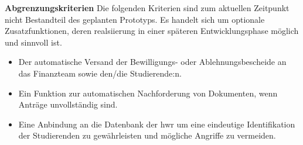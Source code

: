 \textbf{Abgrenzungskriterien}
Die folgenden Kriterien sind zum aktuellen Zeitpunkt nicht Bestandteil des geplanten Prototyps. Es handelt sich um optionale Zusatzfunktionen, deren realsiierung in einer späteren Entwicklungsphase möglich und sinnvoll ist. 
\begin{itemize}
    \item Der automatische Versand der Bewilligungs- oder Ablehnungsbescheide an das Finanzteam sowie den/die Studierende:n. 
    \item Ein Funktion zur automatischen Nachforderung von Dokumenten, wenn Anträge unvollständig sind. 
    \item Eine Anbindung an die Datenbank der \gls{hwr} um eine eindeutige Identifikation der Studierenden zu gewährleisten und mögliche Angriffe zu vermeiden. 
\end{itemize}

